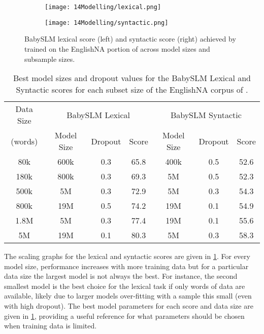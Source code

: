 \begin{figure}[t]
    \centering
    \begin{subfigure}{0.45\linewidth}
        \texttt{[image: 14Modelling/lexical.png]}
    \end{subfigure}
    \hfill
    \begin{subfigure}{0.45\linewidth}
        \texttt{[image: 14Modelling/syntactic.png]}
    \end{subfigure}
    \hfill
    \caption{BabySLM lexical score (left) and syntactic score (right) achieved by \gpt trained on the EnglishNA portion of \ipachildes across model sizes and subsample sizes.}
    \label{fig:babyslm}
\end{figure}

\begin{table}[t!]
    \centering
    \small
    \begin{tabular}{c|ccc|ccc}
    \toprule
         Data Size& \multicolumn{3}{c|}{BabySLM Lexical} & \multicolumn{3}{c}{BabySLM Syntactic} \\
         (words) & Model Size & Dropout & Score & Model Size & Dropout & Score \\
         \midrule
         80k & 600k & 0.3 & 65.8 & 400k & 0.5 & 52.6 \\ 
         180k & 800k & 0.3 & 69.3 & 5M & 0.5 & 52.3\\ 
         500k & 5M & 0.3 & 72.9 & 5M & 0.3 & 54.3\\ 
         800k & 19M & 0.5 & 74.2 & 19M & 0.1 & 54.9 \\ 
         1.8M & 5M & 0.3 & 77.4 & 19M & 0.1 & 55.6 \\ 
         5M & 19M & 0.1 & 80.3 & 5M & 0.3 & 58.3 \\ 
    \bottomrule
    \end{tabular}
    \caption{Best model sizes and dropout values for the BabySLM Lexical and Syntactic scores for each subset size of the EnglishNA corpus of \ipachildes.}
    \label{tab:14-bestsizes}
\end{table}

The scaling graphs for the lexical and syntactic scores are given in \cref{fig:babyslm}. For every model size, performance increases with more training data but for a particular data size the largest model is not always the best. For instance, the second smallest model is the best choice for the lexical task if only  words of data are available, likely due to larger models over-fitting with a sample this small (even with high dropout). The best model parameters for each score and data size are given in \cref{tab:14-bestsizes}, providing a useful reference for what parameters should be chosen when training data is limited.

